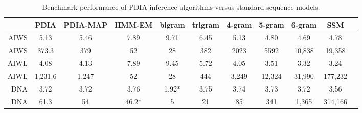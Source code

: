 \begin{table}[t]
    \begin{center}
    \setlength{\tabcolsep}{1.3mm}
\begin{tabular}{r|cccccccccc}
\hline
& PDIA  & PDIA-MAP &  HMM-EM & bigram& trigram & 4-gram & 5-gram & 6-gram & SSM \\
\hline
AIWS & 5.13 & 5.46 &  7.89 & 9.71 & 6.45 & 5.13 & 4.80 & 4.69 & 4.78 \\
AIWS & 373.3 & 379 & 52 & 28 & 382 & 2023 & 5592 & 10,838 & 19,358 \\
\hline
\hline
AIWL & 4.08 & 4.13 &  7.89 & 9.45 & 5.72 & 4.05 & 3.51 & 3.32 & 3.24 \\
AIWL & 1,231.6 & 1,247 &  52 & 28 & 444 & 3,249 & 12,324 & 31,990 & 177,232 \\
\hline
\hline
DNA & 3.72 & 3.72 &  3.76 & 1.92* & 3.75 & 3.74 & 3.73 & 3.72 & 3.56 \\
DNA & 61.3 & 54 & 46.2* &  5 & 21 & 85 & 341 & 1,365 & 314,166 \\
\hline
\end{tabular}
\end{center}
\caption[Short]{Benchmark performance of PDIA inference algorithms versus standard sequence models.}
\label{table:results}
\end{table}

